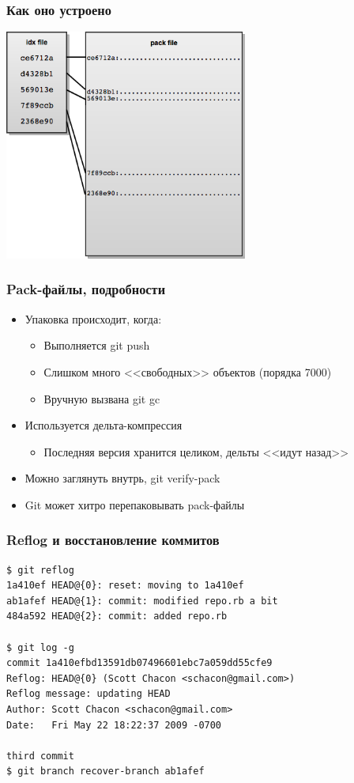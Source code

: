 \documentclass{../mcsslides}
\begin{document}
    \begin{frame}
        \frametitle{Как оно устроено}
        \begin{center}
            \includegraphics[width=0.6\textwidth]{gitPackFiles.png}
        \end{center}
    \end{frame}

    \begin{frame}
        \frametitle{Pack-файлы, подробности}
        \begin{itemize}
            \item Упаковка происходит, когда:
            \begin{itemize}
                \item Выполняется git push
                \item Слишком много <<свободных>> объектов (порядка 7000)
                \item Вручную вызвана git gc
            \end{itemize}
            \item Используется дельта-компрессия
            \begin{itemize}
                \item Последняя версия хранится целиком, дельты <<идут назад>>
            \end{itemize}
            \item Можно заглянуть внутрь, git verify-pack
            \item Git может хитро перепаковывать pack-файлы
        \end{itemize}
    \end{frame}

    \begin{frame}[fragile]
        \frametitle{Reflog и восстановление коммитов}
            \begin{verbatim}
$ git reflog
1a410ef HEAD@{0}: reset: moving to 1a410ef
ab1afef HEAD@{1}: commit: modified repo.rb a bit
484a592 HEAD@{2}: commit: added repo.rb

$ git log -g
commit 1a410efbd13591db07496601ebc7a059dd55cfe9
Reflog: HEAD@{0} (Scott Chacon <schacon@gmail.com>)
Reflog message: updating HEAD
Author: Scott Chacon <schacon@gmail.com>
Date:   Fri May 22 18:22:37 2009 -0700

third commit
$ git branch recover-branch ab1afef
            \end{verbatim}
    \end{frame}
\end{document}
